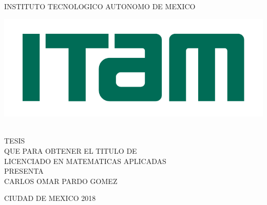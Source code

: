 \begin{titlepage}
\begin{center}

\large{INSTITUTO TECNOLOGICO AUTONOMO DE MEXICO}\\[2em]
\hline

\begin{center}
	\includegraphics{Figures/Miscellaneous/logo-ITAM.pdf}
\end{center}

\vspace{1em}

{}\\[3em]

\textsc{\large TESIS}\\[1em]

\textsc{\normalsize QUE PARA OBTENER EL TITULO DE}\\[1em]

\textsc{\normalsize LICENCIADO EN MATEMATICAS APLICADAS}\\[1em]

\textsc{\normalsize PRESENTA}\\[1em]

\textsc{\Large CARLOS OMAR PARDO GOMEZ}\\[3em]

\end{center}

\vspace*{\fill}
\textsc{CIUDAD DE MEXICO \hspace*{\fill} 2018}

\end{titlepage}